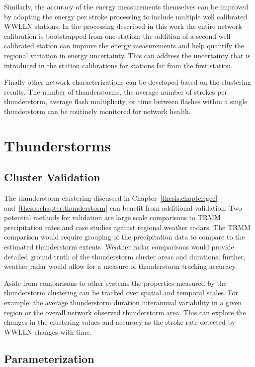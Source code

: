 Similarly, the accuracy of the energy measurements themselves can be improved by adapting the energy per stroke processing to include multiple well calibrated WWLLN stations.
In the processing described in this work the entire network calibration is bootstrapped from one station; the addition of a second well calibrated station can improve the energy measurements and help quantify the regional variation in energy uncertainty.
This can address the uncertainty that is introduced in the station calibrations for stations far from the first station.

Finally other network characterizations can be developed based on the clustering results.
The number of thunderstorms, the average number of strokes per thunderstorm, average flash multiplicity, or time between flashes within a single thunderstorm can be routinely monitored for network health.

\section{Thunderstorms}

\subsection{Cluster Validation}

The thunderstorm clustering discussed in Chapter~\ref{thesis:chapter:gec} and~\ref{thesis:chapter:thunderstorm} can benefit from additional validation.
Two potential methods for validation are large scale comparisons to TRMM precipitation rates and case studies against regional weather radars.
The TRMM comparison would require grouping of the precipitation data to compare to the estimated thunderstorm extents.
Weather radar comparisons would provide detailed ground truth of the thunderstorm cluster areas and durations; further, weather radar would allow for a measure of thunderstorm tracking accuracy.

Aside from comparisons to other systems the properties measured by the thunderstorm clustering can be tracked over spatial and temporal scales.
For example: the average thunderstorm duration interannual variability in a given region or the overall network observed thunderstorm area.
This can explore the changes in the clustering values and accuracy as the stroke rate detected by WWLLN changes with time.

\subsection{Parameterization}

